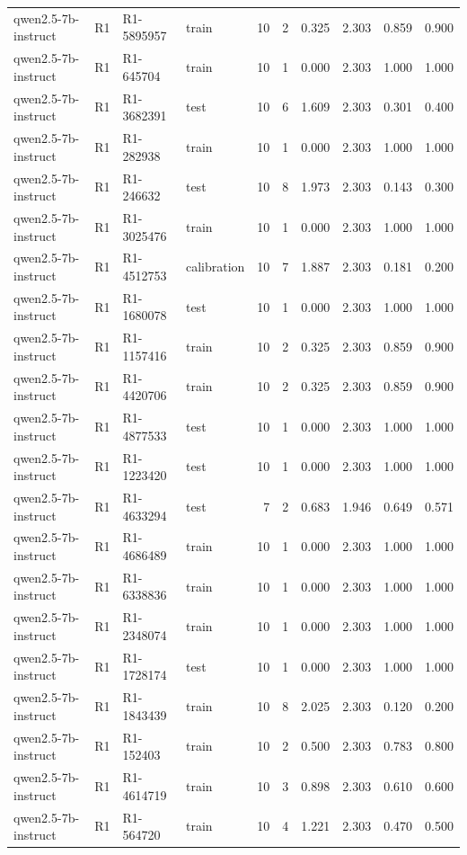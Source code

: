 \begin{table}
\begin{tabular}{llllrrrrrr}
qwen2.5-7b-instruct & R1 & R1-5895957 & train & 10 & 2 & 0.325 & 2.303 & 0.859 & 0.900 \\
qwen2.5-7b-instruct & R1 & R1-645704 & train & 10 & 1 & 0.000 & 2.303 & 1.000 & 1.000 \\
qwen2.5-7b-instruct & R1 & R1-3682391 & test & 10 & 6 & 1.609 & 2.303 & 0.301 & 0.400 \\
qwen2.5-7b-instruct & R1 & R1-282938 & train & 10 & 1 & 0.000 & 2.303 & 1.000 & 1.000 \\
qwen2.5-7b-instruct & R1 & R1-246632 & test & 10 & 8 & 1.973 & 2.303 & 0.143 & 0.300 \\
qwen2.5-7b-instruct & R1 & R1-3025476 & train & 10 & 1 & 0.000 & 2.303 & 1.000 & 1.000 \\
qwen2.5-7b-instruct & R1 & R1-4512753 & calibration & 10 & 7 & 1.887 & 2.303 & 0.181 & 0.200 \\
qwen2.5-7b-instruct & R1 & R1-1680078 & test & 10 & 1 & 0.000 & 2.303 & 1.000 & 1.000 \\
qwen2.5-7b-instruct & R1 & R1-1157416 & train & 10 & 2 & 0.325 & 2.303 & 0.859 & 0.900 \\
qwen2.5-7b-instruct & R1 & R1-4420706 & train & 10 & 2 & 0.325 & 2.303 & 0.859 & 0.900 \\
qwen2.5-7b-instruct & R1 & R1-4877533 & test & 10 & 1 & 0.000 & 2.303 & 1.000 & 1.000 \\
qwen2.5-7b-instruct & R1 & R1-1223420 & test & 10 & 1 & 0.000 & 2.303 & 1.000 & 1.000 \\
qwen2.5-7b-instruct & R1 & R1-4633294 & test & 7 & 2 & 0.683 & 1.946 & 0.649 & 0.571 \\
qwen2.5-7b-instruct & R1 & R1-4686489 & train & 10 & 1 & 0.000 & 2.303 & 1.000 & 1.000 \\
qwen2.5-7b-instruct & R1 & R1-6338836 & train & 10 & 1 & 0.000 & 2.303 & 1.000 & 1.000 \\
qwen2.5-7b-instruct & R1 & R1-2348074 & train & 10 & 1 & 0.000 & 2.303 & 1.000 & 1.000 \\
qwen2.5-7b-instruct & R1 & R1-1728174 & test & 10 & 1 & 0.000 & 2.303 & 1.000 & 1.000 \\
qwen2.5-7b-instruct & R1 & R1-1843439 & train & 10 & 8 & 2.025 & 2.303 & 0.120 & 0.200 \\
qwen2.5-7b-instruct & R1 & R1-152403 & train & 10 & 2 & 0.500 & 2.303 & 0.783 & 0.800 \\
qwen2.5-7b-instruct & R1 & R1-4614719 & train & 10 & 3 & 0.898 & 2.303 & 0.610 & 0.600 \\
qwen2.5-7b-instruct & R1 & R1-564720 & train & 10 & 4 & 1.221 & 2.303 & 0.470 & 0.500 \\

\end{tabular}
\end{table}
